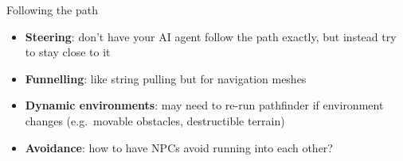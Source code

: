 %		
%
%		
%
%		
%
%		

\begin{frame}{Following the path}
	\begin{itemize}
		\pause\item \textbf{Steering}: don't have your AI agent follow the path exactly, but
			instead try to stay close to it
		\pause\item \textbf{Funnelling}: like string pulling but for navigation meshes
		\pause\item \textbf{Dynamic environments}: may need to re-run pathfinder if environment changes
			(e.g.\ movable obstacles, destructible terrain)
		\pause\item \textbf{Avoidance}: how to have NPCs avoid running into each other?
	\end{itemize}
\end{frame}

